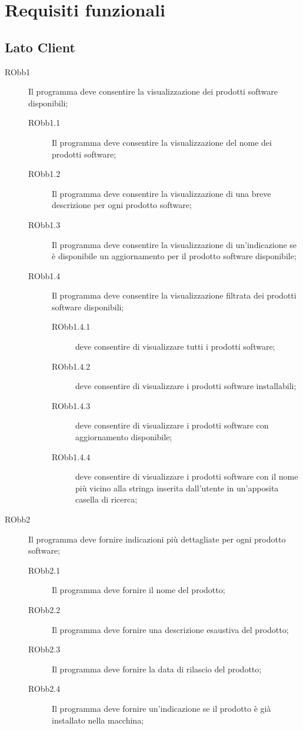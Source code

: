 \documentclass[../RelazioneFinale]{subfiles}
\begin{document}
		
		\section{Requisiti funzionali}
		
			\subsection{Lato Client}
			\begin{description}
			
				\item[RObb1] Il programma deve consentire la visualizzazione dei prodotti software disponibili;
				\begin{description}
					\item[RObb1.1] Il programma deve consentire la visualizzazione del nome dei prodotti software;
					\item[RObb1.2] Il programma deve consentire la visualizzazione di una breve descrizione per ogni prodotto software;
					\item[RObb1.3] Il programma deve consentire la visualizzazione di un'indicazione se è disponibile un aggiornamento per il prodotto software disponibile;
					\item[RObb1.4] Il programma deve consentire la visualizzazione filtrata dei prodotti software disponibili;
					\begin{description}
						\item[RObb1.4.1] deve consentire di visualizzare tutti i prodotti software;
						\item[RObb1.4.2] deve consentire di visualizzare i prodotti software installabili;
						\item[RObb1.4.3] deve consentire di visualizzare i prodotti software con aggiornamento disponibile;
						\item[RObb1.4.4] deve consentire di visualizzare i prodotti software con il nome più vicino alla stringa inserita dall'utente in un'apposita casella di ricerca;
					\end{description}
				\end{description}
				
				\item[RObb2] Il programma deve fornire indicazioni più dettagliate per ogni prodotto software;
					\begin{description}
						\item[RObb2.1] Il programma deve fornire il nome del prodotto;
						\item[RObb2.2] Il programma deve fornire una descrizione esaustiva del prodotto;
						\item[RObb2.3] Il programma deve fornire la data di rilascio del prodotto;
						\item[RObb2.4] Il programma deve fornire un'indicazione se il prodotto è già installato nella macchina;
					\end{description}									
				

\end{description}
\end{document}
